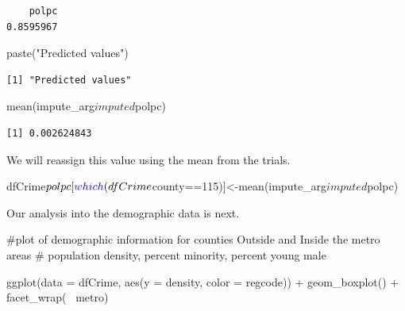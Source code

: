 \documentclass[]{article}
\newenvironment{Shaded}{}{}
\newcommand{\CommentTok}[1]{\textcolor[rgb]{0.00,0.50,0.00}{#1}}
\newcommand{\DataTypeTok}[1]{#1}
\newcommand{\DecValTok}[1]{#1}
\newcommand{\KeywordTok}[1]{\textcolor[rgb]{0.00,0.00,1.00}{#1}}
\newcommand{\NormalTok}[1]{#1}
\newcommand{\OperatorTok}[1]{#1}
\newcommand{\StringTok}[1]{\textcolor[rgb]{0.00,0.50,0.50}{#1}}
\begin{document}
\begin{verbatim}
    polpc 
0.8595967 
\end{verbatim}

\begin{Shaded}
\begin{Highlighting}[]
\KeywordTok{paste}\NormalTok{(}\StringTok{"Predicted values"}\NormalTok{)}
\end{Highlighting}
\end{Shaded}

\begin{verbatim}
[1] "Predicted values"
\end{verbatim}

\begin{Shaded}
\begin{Highlighting}[]
\KeywordTok{mean}\NormalTok{(impute_arg}\OperatorTok{$}\NormalTok{imputed}\OperatorTok{$}\NormalTok{polpc)}
\end{Highlighting}
\end{Shaded}

\begin{verbatim}
[1] 0.002624843
\end{verbatim}

We will reassign this value using the mean from the trials.

\begin{Shaded}
\begin{Highlighting}[]
\NormalTok{dfCrime}\OperatorTok{$}\NormalTok{polpc[}\KeywordTok{which}\NormalTok{(dfCrime}\OperatorTok{$}\NormalTok{county}\OperatorTok{==}\DecValTok{115}\NormalTok{)]<-}\KeywordTok{mean}\NormalTok{(impute_arg}\OperatorTok{$}\NormalTok{imputed}\OperatorTok{$}\NormalTok{polpc)}
\end{Highlighting}
\end{Shaded}

Our analysis into the demographic data is next.

\begin{Shaded}
\begin{Highlighting}[]
\CommentTok{#plot of demographic information for counties Outside and Inside the metro areas}
\CommentTok{# population density, percent minority, percent young male}

\KeywordTok{ggplot}\NormalTok{(}\DataTypeTok{data =}\NormalTok{ dfCrime, }\KeywordTok{aes}\NormalTok{(}\DataTypeTok{y =}\NormalTok{ density, }\DataTypeTok{color =}\NormalTok{ regcode)) }\OperatorTok{+}\StringTok{ }
\StringTok{      }\KeywordTok{geom_boxplot}\NormalTok{() }\OperatorTok{+}\StringTok{ }\KeywordTok{facet_wrap}\NormalTok{(}\OperatorTok{~}\StringTok{ }\NormalTok{metro)}
\end{Highlighting}
\end{Shaded}
\end{document}
